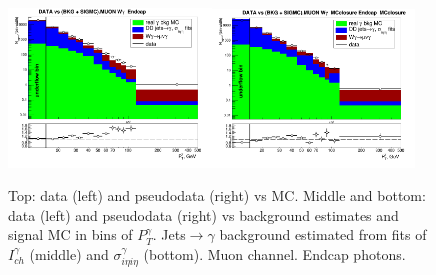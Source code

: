 \begin{figure}[htb]
\begin{center}
\includegraphics[width=0.48\textwidth]{../figs/figs_v11/MUON_WGamma/PrepareYields/c_DATAvsBkgPlusSigMCc_MUON_WGamma_TEMPL_SIHIH_UNblind__Endcap__phoEt.png}\includegraphics[width=0.48\textwidth]{../figs/figs_v11/MUON_WGamma/PrepareYields/c_DATAvsBkgPlusSigMCc_MUON_WGamma_TEMPL_SIHIH_UNblind_MCclosure__Endcap__phoEt_MCclosure.png}
  \caption{Top: data (left) and pseudodata (right) vs MC. Middle and bottom: data (left) and pseudodata (right) vs background estimates and signal MC in bins of $P_T^{\gamma}$. Jets$\rightarrow\gamma$ background estimated from fits of $I_{ch}^{\gamma}$ (middle) and  $\sigma_{i\eta i\eta}^{\gamma}$ (bottom). Muon channel. Endcap photons. }
  \label{fig:DATAvsBKGandSIGMC_MCclosure_MUON_E}
  \end{center}
\end{figure}

